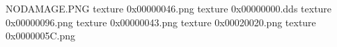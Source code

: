 NODAMAGE.PNG
texture 0x00000046.png
texture 0x00000000.dds
texture 0x00000096.png
texture 0x00000043.png
texture 0x00020020.png
texture 0x0000005C.png
